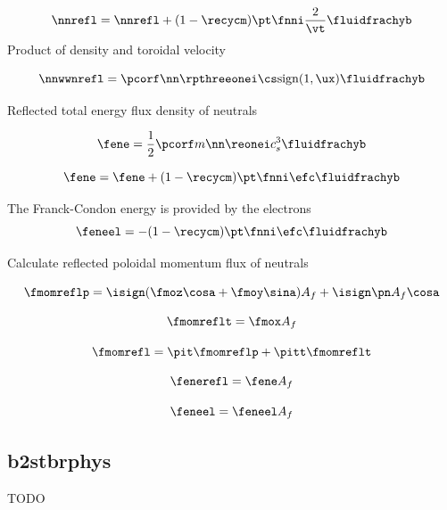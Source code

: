 \begin{equation}
    \nnrefl = \nnrefl + (1-\recycm) \pt \fnni \frac{2}{\vt} \fluidfrachyb
\end{equation}
Product of density and toroidal velocity

\begin{equation}
    \nnwwnrefl = \pcorf \nn \rpthreeonei \cs \mathrm{sign}(1,\ux) \fluidfrachyb
\end{equation}

Reflected total energy flux density of neutrals

\begin{equation}
    \fene = \frac{1}{2} \pcorf m \nn \reonei c_s^3 \fluidfrachyb
\end{equation}

\begin{equation}
    \fene = \fene + (1-\recycm) \pt \fnni \efc \fluidfrachyb
\end{equation}

The Franck-Condon energy is provided by the electrons
\begin{equation}
    \feneel = - (1-\recycm) \pt \fnni \efc \fluidfrachyb
\end{equation}

Calculate reflected poloidal momentum flux of neutrals

\begin{equation}
    \fmomreflp = \isign (\fmoz \cosa + \fmoy \sina) A_f + \isign \pn A_f \cosa
\end{equation}

\begin{equation}
    \fmomreflt =  \fmox A_f
\end{equation}

\begin{equation}
    \fmomrefl = \pit \fmomreflp + \pitt \fmomreflt
\end{equation}

\begin{equation}
    \fenerefl =  \fene A_f
\end{equation}

\begin{equation}
    \feneel = \feneel A_f
\end{equation}

\subsection{b2stbrphys}

TODO


